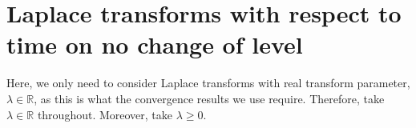 
\section{Laplace transforms with respect to time on no change of level}\label{sec: lst on no change}
Here, we only need to consider Laplace transforms with real transform parameter, \(\lambda \in \mathbb R\), as this is what the convergence results we use require. Therefore, take \(\lambda \in\mathbb R\) throughout. Moreover, take \(\lambda \geq 0\). 

